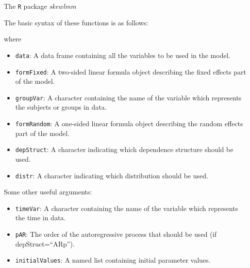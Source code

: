 \begin{frame}[fragile]{The \texttt{R} package \emph{skewlmm}}
\protect\hypertarget{the-package-1}{}

The basic syntax of these functions is as follows:

\begin{Shaded}
\begin{Highlighting}[]
\end{Highlighting}
\end{Shaded}

where

\begin{itemize}
\item
  \texttt{data}: A data frame containing all the variables to be used in
  the model.
\item
  \texttt{formFixed}: A two-sided linear formula object describing the
  fixed effects part of the model.
\item
  \texttt{groupVar}: A character containing the name of the variable
  which represents the subjects or groups in data.
\end{itemize}

\end{frame}

\begin{frame}[fragile]

\begin{itemize}
\item
  \texttt{formRandom}: A one-sided linear formula object describing the
  random effects part of the model.
\item
  \texttt{depStruct}: A character indicating which dependence structure
  should be used.
\item
  \texttt{distr}: A character indicating which distribution should be
  used.\pause
\end{itemize}

Some other useful arguments:

\begin{itemize}
\item
  \texttt{timeVar}: A character containing the name of the variable
  which represents the time in data.
\item
  \texttt{pAR}: The order of the autoregressive process that should be
  used (if depStruct=``ARp'').
\item
  \texttt{initialValues}: A named list containing initial parameter
  values.
\end{itemize}

\end{frame}

